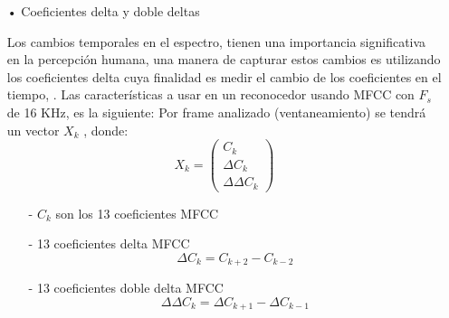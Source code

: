 \begin{enumerate}
\begin{enumerate}
\item[•]Coeficientes delta y doble deltas
\par
Los cambios temporales en el espectro, tienen una importancia significativa en la percepción humana, una manera de capturar estos cambios es utilizando los coeficientes delta cuya finalidad es medir el cambio de los coeficientes en el tiempo, \cite{xuedong}. Las características a usar en un reconocedor usando MFCC con $F_{s}$ de 16 KHz, es la siguiente:
\vskip 0.5cm
Por frame analizado (ventaneamiento) se tendrá un vector $X_{k}$ , donde:
\begin{equation}
\label{eq:ecuacion66}
X_{k} = 
\begin{pmatrix}
C_{k}\\ 
\Delta C_{k}\\ 
\Delta \Delta C_{k}
\end{pmatrix}
\end{equation}

\begin{enumerate}
\item[-]$C_k$ son los 13 coeficientes MFCC 
\item[-]13 coeficientes delta MFCC
\begin{equation}
\label{eq:ecuacion67}
\Delta C_{k} = C_{k + 2} - C_{k - 2}
\end{equation}
\item[-]13 coeficientes doble delta MFCC
\begin{equation}
\label{eq:ecuacion68}
\Delta \Delta C_{k} = \Delta C_{k + 1} - \Delta C_{k - 1}
\end{equation}
\end{enumerate}
\end{enumerate}
\end{enumerate}

